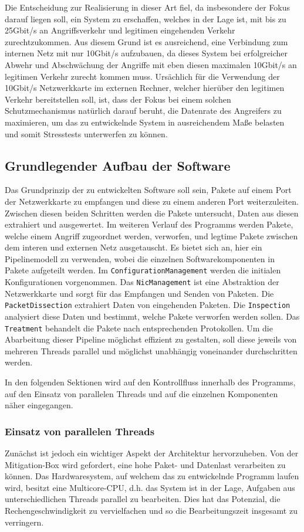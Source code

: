 \documentclass[../review_2.tex]{subfiles}
\begin{document}
Die Entscheidung zur Realisierung in dieser Art fiel, da insbesondere der Fokus darauf liegen soll, ein System zu erschaffen, welches in der Lage ist, mit bis zu 25Gbit/s an Angriffsverkehr und legitimen eingehenden Verkehr zurechtzukommen. Aus diesem Grund ist es ausreichend, eine Verbindung zum internen Netz mit nur 10Gbit/s aufzubauen, da dieses System bei erfolgreicher Abwehr und Abschwächung der Angriffe mit eben diesen maximalen 10Gbit/s an legitimen Verkehr zurecht kommen muss. Ursächlich für die Verwendung der 10Gbit/s Netzwerkkarte im externen Rechner, welcher hierüber den legitimen Verkehr bereitstellen soll, ist, dass der Fokus bei einem solchen Schutzmechanismus natürlich darauf beruht, die Datenrate des Angreifers zu maximieren, um das zu entwickelnde System in ausreichendem Maße belasten und somit Stresstests unterwerfen zu können.


\subsection{Grundlegender Aufbau der Software} \label{section:basic_structure}
Das Grundprinzip der zu entwickelten Software soll sein, Pakete auf einem Port der Netzwerkkarte zu empfangen und diese zu einem anderen Port weiterzuleiten. Zwischen diesen beiden Schritten werden die Pakete untersucht, Daten aus diesen extrahiert und ausgewertet. Im weiteren Verlauf des Programms werden Pakete, welche einem Angriff zugeordnet werden, verworfen, und legtime Pakete zwischen dem interen und externen Netz ausgetauscht. Es bietet sich an, hier ein Pipelinemodell zu verwenden, wobei die einzelnen Softwarekomponenten in Pakete aufgeteilt werden. Im \texttt{ConfigurationManagement} werden die initialen Konfigurationen vorgenommen. Das \texttt{NicManagement} ist eine Abstraktion der Netzwerkkarte und sorgt für das Empfangen und Senden von Paketen. Die \texttt{PacketDissection} extrahiert Daten von eingehenden Paketen. Die \texttt{Inspection} analysiert diese Daten und bestimmt, welche Pakete verworfen werden sollen. Das \texttt{Treatment} behandelt die Pakete nach entsprechenden Protokollen. Um die Abarbeitung dieser Pipeline möglichst effizient zu gestalten, soll diese jeweils von mehreren Threads parallel und möglichst unabhängig voneinander durchschritten werden.

In den folgenden Sektionen wird auf den Kontrollfluss innerhalb des Programms, auf den Einsatz von parallelen Threads und auf die einzelnen Komponenten näher eingegangen.

\subsubsection{Einsatz von parallelen Threads}
Zunächst ist jedoch ein wichtiger Aspekt der Architektur hervorzuheben. Von der Mitigation-Box wird gefordert, eine hohe Paket- und Datenlast verarbeiten zu können. Das Hardwaresystem, auf welchem das zu entwickelnde Programm laufen wird, besitzt eine Multicore-CPU, d.h. das System ist in der Lage, Aufgaben aus unterschiedlichen Threads parallel zu bearbeiten. Dies hat das Potenzial, die Rechengeschwindigkeit zu vervielfachen und so die Bearbeitungszeit insgesamt zu verringern.
\end{document}
